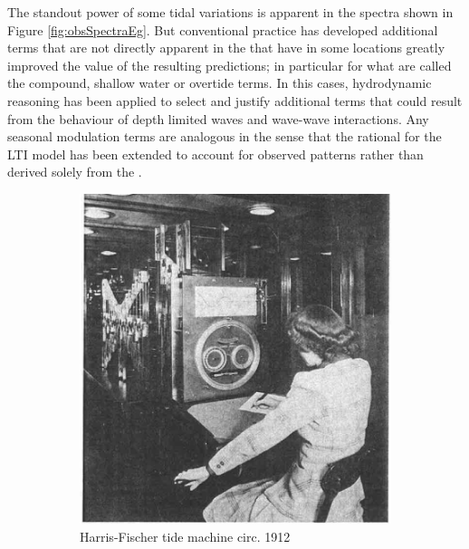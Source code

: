 The standout power of some tidal variations is apparent in the spectra shown in Figure \ref{fig:obsSpectraEg}. 
But conventional practice has developed additional terms that are not directly apparent in the \ATGP{} that have in some locations greatly improved the value of the resulting predictions; in particular for what are called the compound, shallow water or overtide terms. In this cases, hydrodynamic reasoning has been applied to select and justify additional terms that could result from the behaviour of depth limited waves and wave-wave interactions.
Any seasonal modulation terms are analogous in the sense that the rational for the LTI model has been extended to account for observed patterns rather than derived solely from the \ATGP{}.
\begin{figure}[!hbt] \centering
	\begin{subfigure}[t]{\figwidthHalf}
	    \includegraphics[width=\textwidth]{figures/images/zetler_tidal_computer_lady_1921.png}
	    \caption{Harris-Fischer tide machine circ. 1912 }
    \end{subfigure}
    \hfill
    \begin{subfigure}[t]{\figwidthHalf}

\end{subfigure}
\end{figure}
